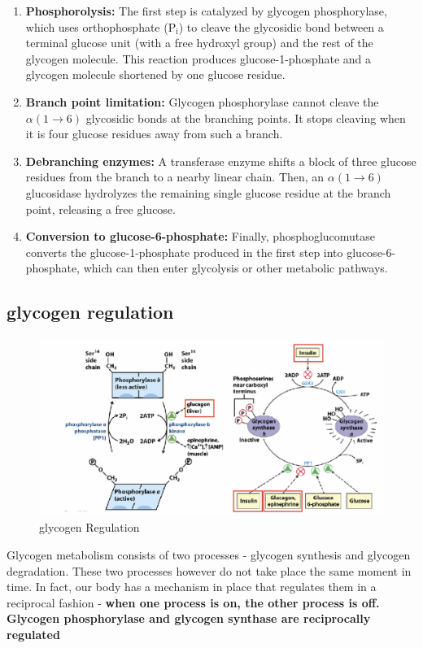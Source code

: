 \documentclass[../main.tex]{subfiles}
\begin{document}
\begin{enumerate}
    \item \textbf{Phosphorolysis:} The first step is catalyzed by glycogen phosphorylase, which uses orthophosphate (\( \text{P}_{\text{i}} \)) to cleave the glycosidic bond between a terminal glucose unit (with a free hydroxyl group) and the rest of the glycogen molecule. This reaction produces glucose-1-phosphate and a glycogen molecule shortened by one glucose residue.

    \item \textbf{Branch point limitation:} Glycogen phosphorylase cannot cleave the \(\alpha(1\rightarrow6)\) glycosidic bonds at the branching points. It stops cleaving when it is four glucose residues away from such a branch.

    \item \textbf{Debranching enzymes:} A transferase enzyme shifts a block of three glucose residues from the branch to a nearby linear chain. Then, an \(\alpha(1\rightarrow6)\) glucosidase hydrolyzes the remaining single glucose residue at the branch point, releasing a free glucose.

    \item \textbf{Conversion to glucose-6-phosphate:} Finally, phosphoglucomutase converts the glucose-1-phosphate produced in the first step into glucose-6-phosphate, which can then enter glycolysis or other metabolic pathways.
\end{enumerate}
\subsection{glycogen regulation}
\begin{figure}[H]
    \centering
    \includegraphics[width=\linewidth]{glycogenregulation.png}
    \caption{glycogen Regulation}
    \label{fig:enter-label}
\end{figure}
Glycogen metabolism consists of two processes - glycogen synthesis and glycogen degradation. These two processes however do not take place the same moment in time. In fact, our body has a mechanism in place that regulates them in a reciprocal fashion - 
\textbf{when one process is on, the other process is off.} \textbf{Glycogen phosphorylase and glycogen synthase are reciprocally regulated}
\end{document}
